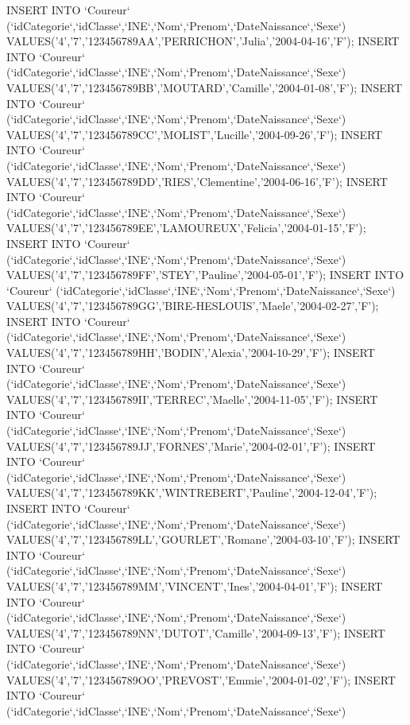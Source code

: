 \begin{DoxyCode}
INSERT INTO `Coureur` (`idCategorie`,`idClasse`,`INE`,`Nom`,`Prenom`,`DateNaissance`,`Sexe`)
       VALUES('4','7','123456789AA','PERRICHON','Julia','2004-04-16','F');
INSERT INTO `Coureur` (`idCategorie`,`idClasse`,`INE`,`Nom`,`Prenom`,`DateNaissance`,`Sexe`)
       VALUES('4','7','123456789BB','MOUTARD','Camille','2004-01-08','F');
INSERT INTO `Coureur` (`idCategorie`,`idClasse`,`INE`,`Nom`,`Prenom`,`DateNaissance`,`Sexe`)
       VALUES('4','7','123456789CC','MOLIST','Lucille','2004-09-26','F');
INSERT INTO `Coureur` (`idCategorie`,`idClasse`,`INE`,`Nom`,`Prenom`,`DateNaissance`,`Sexe`)
       VALUES('4','7','123456789DD','RIES','Clementine','2004-06-16','F');
INSERT INTO `Coureur` (`idCategorie`,`idClasse`,`INE`,`Nom`,`Prenom`,`DateNaissance`,`Sexe`)
       VALUES('4','7','123456789EE','LAMOUREUX','Felicia','2004-01-15','F');
INSERT INTO `Coureur` (`idCategorie`,`idClasse`,`INE`,`Nom`,`Prenom`,`DateNaissance`,`Sexe`)
       VALUES('4','7','123456789FF','STEY','Pauline','2004-05-01','F');
INSERT INTO `Coureur` (`idCategorie`,`idClasse`,`INE`,`Nom`,`Prenom`,`DateNaissance`,`Sexe`)
       VALUES('4','7','123456789GG','BIRE-HESLOUIS','Maele','2004-02-27','F');
INSERT INTO `Coureur` (`idCategorie`,`idClasse`,`INE`,`Nom`,`Prenom`,`DateNaissance`,`Sexe`)
       VALUES('4','7','123456789HH','BODIN','Alexia','2004-10-29','F');
INSERT INTO `Coureur` (`idCategorie`,`idClasse`,`INE`,`Nom`,`Prenom`,`DateNaissance`,`Sexe`)
       VALUES('4','7','123456789II','TERREC','Maelle','2004-11-05','F');
INSERT INTO `Coureur` (`idCategorie`,`idClasse`,`INE`,`Nom`,`Prenom`,`DateNaissance`,`Sexe`)
       VALUES('4','7','123456789JJ','FORNES','Marie','2004-02-01','F');
INSERT INTO `Coureur` (`idCategorie`,`idClasse`,`INE`,`Nom`,`Prenom`,`DateNaissance`,`Sexe`)
       VALUES('4','7','123456789KK','WINTREBERT','Pauline','2004-12-04','F');
INSERT INTO `Coureur` (`idCategorie`,`idClasse`,`INE`,`Nom`,`Prenom`,`DateNaissance`,`Sexe`)
       VALUES('4','7','123456789LL','GOURLET','Romane','2004-03-10','F');
INSERT INTO `Coureur` (`idCategorie`,`idClasse`,`INE`,`Nom`,`Prenom`,`DateNaissance`,`Sexe`)
       VALUES('4','7','123456789MM','VINCENT','Ines','2004-04-01','F');
INSERT INTO `Coureur` (`idCategorie`,`idClasse`,`INE`,`Nom`,`Prenom`,`DateNaissance`,`Sexe`)
       VALUES('4','7','123456789NN','DUTOT','Camille','2004-09-13','F');
INSERT INTO `Coureur` (`idCategorie`,`idClasse`,`INE`,`Nom`,`Prenom`,`DateNaissance`,`Sexe`)
       VALUES('4','7','123456789OO','PREVOST','Emmie','2004-01-02','F');
INSERT INTO `Coureur` (`idCategorie`,`idClasse`,`INE`,`Nom`,`Prenom`,`DateNaissance`,`Sexe`)

\end{DoxyCode}
